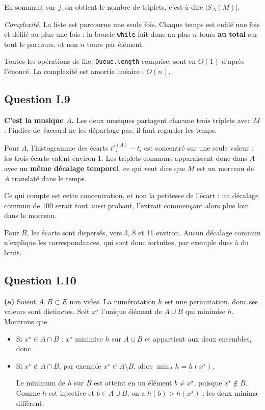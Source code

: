 \documentclass[11pt,a4paper]{article}
\newcommand{\equationajustee}[1]{%
  \sbox{\boiteequation}{$\displaystyle #1$}%
  \ifdim\wd\boiteequation>\linewidth
    \[\resizebox{\linewidth}{!}{\usebox{\boiteequation}}\]%
  \else
    \[#1\]%
  \fi}
\begin{document}
En sommant sur \(j\), on obtient le nombre de triplets, c'est-à-dire \(|S_\Delta(M)|\).

\emph{Complexité.} La liste est parcourue une seule fois. Chaque temps est enfilé une fois et défilé au plus une fois : la boucle \texttt{while} fait donc au plus \(n\) tours \textbf{au total} sur tout le parcours, et non \(n\) tours par élément.

Toutes les opérations de file, \texttt{Queue.length} comprise, sont en \(O(1)\) d'après l'énoncé. La complexité est amortie linéaire : \(\boxed{O(n)}\).

\hypertarget{question-i.9}{%
\subsection{Question I.9}\label{question-i.9}}

\textbf{C'est la musique \(A\).} Les deux musiques partagent chacune trois triplets avec \(M\) : l'indice de Jaccard ne les départage pas, il faut regarder les temps.

Pour \(A\), l'histogramme des écarts \(t'^{(A)}_i-t_i\) est concentré sur une seule valeur : les trois écarts valent environ 1. Les triplets communs apparaissent donc dans \(A\) avec un \textbf{même décalage temporel}, ce qui veut dire que \(M\) est un morceau de \(A\) translaté dans le temps.

Ce qui compte est cette concentration, et non la petitesse de l'écart : un décalage commun de 100 serait tout aussi probant, l'extrait commençant alors plus loin dans le morceau.

Pour \(B\), les écarts sont dispersés, vers 3, 8 et 11 environ. Aucun décalage commun n'explique les correspondances, qui sont donc fortuites, par exemple dues à du bruit.

\hypertarget{question-i.10}{%
\subsection{Question I.10}\label{question-i.10}}

\textbf{(a)} Soient \(A,B\subset E\) non vides. La numérotation \(h\) est une permutation, donc ses valeurs sont distinctes. Soit \(x^\star\) l'unique élément de \(A\cup B\) qui minimise \(h\). Montrons que
\equationajustee{\mathsf{minHash}(h)(A)=\mathsf{minHash}(h)(B)\iff x^\star\in A\cap B.}

\begin{itemize}
\item
  Si \(x^\star\in A\cap B\) : \(x^\star\) minimise \(h\) sur \(A\cup B\) et appartient aux deux ensembles, donc

  \equationajustee{\min_A h=h(x^\star)=\min_B h.}
\item
  Si \(x^\star\notin A\cap B\), par exemple \(x^\star\in A\setminus B\), alors \(\min_A h=h(x^\star)\).

  Le minimum de \(h\) sur \(B\) est atteint en un élément \(b\neq x^\star\), puisque \(x^\star\notin B\).
  Comme \(h\) est injective et \(b\in A\cup B\), on a \(h(b)>h(x^\star)\) : les deux minima diffèrent.
\end{itemize}
\end{document}
